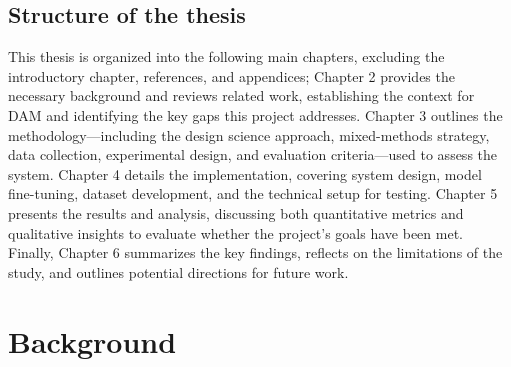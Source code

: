 \documentclass[a4paper,10pt,twocolumn]{article}
\numberwithin{figure}{section}
\numberwithin{table}{section}
\begin{document}
\subsection{Structure of the thesis}

This thesis is organized into the following main chapters, 
excluding the introductory chapter, references, and appendices; 
Chapter 2 provides the necessary background and reviews related work,
 establishing the context for DAM and identifying the key gaps this project addresses. 
 Chapter 3 outlines the methodology—including the design science approach, 
 mixed-methods strategy, data collection, experimental design, and evaluation 
 criteria—used to assess the system. 
 Chapter 4 details the implementation, covering system design, 
 model fine-tuning, dataset development, and the technical setup for testing. 
 Chapter 5 presents the results and analysis, discussing both quantitative 
 metrics and qualitative insights to evaluate whether the project’s goals have been met. 
 Finally, Chapter 6 summarizes the key findings, reflects on the limitations of the study, 
 and outlines potential directions for future work.




\newpage
\section{Background}


\end{document}
